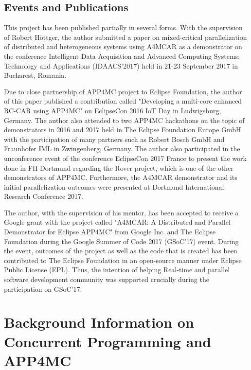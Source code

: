 \section{Events and Publications}

This project has been published partially in several forms. With the supervision of Robert H{\"o}ttger, the author submitted a paper on mixed-critical parallelization of distributed and heterogeneous systems \cite{constrainedpaper} using A4MCAR as a demonstrator on the conference Intelligent Data Acquisition and Advanced Computing Systems: Technology and Applications (IDAACS'2017) held in 21-23 September 2017 in Bucharest, Romania.

Due to close partnership of APP4MC project to Eclipse Foundation, the author of this paper published a contribution called "Developing a multi-core enhanced RC-CAR using APP4MC" on EclipseCon 2016 IoT Day in Ludwigsburg, Germany. The author also attended to two APP4MC hackathons on the topic of demonstrators in 2016 and 2017 held in The Eclipse Foundation Europe GmbH with the participation of many partners such as Robert Bosch GmbH and Fraunhofer IML in Zwingenberg, Germany. The author also participated in the unconference event of the conference EclipseCon 2017 France to present the work done in FH Dortmund regarding the Rover project, which is one of the other demonstrators of APP4MC. Furthermore, the A4MCAR demonstrator and its initial parallelization outcomes were presented at Dortmund International Research Conference 2017.

The author, with the supervision of his mentor, has been accepted to receive a Google grant with the project called "A4MCAR: A Distributed and Parallel Demonstrator for Eclipse APP4MC" \cite{gsoc} from Google Inc. and The Eclipse Foundation during the Google Summer of Code 2017 (GSoC'17) event. During the event, outcomes of the project as well as the code that is created has been contributed to The Eclipse Foundation in an open-source manner under Eclipse Public License (EPL). Thus, the intention of helping Real-time and parallel software development community was supported crucially during the participation on GSoC'17.

\chapter{Background Information on Concurrent Programming and APP4MC} \label{multicorechapter} 
